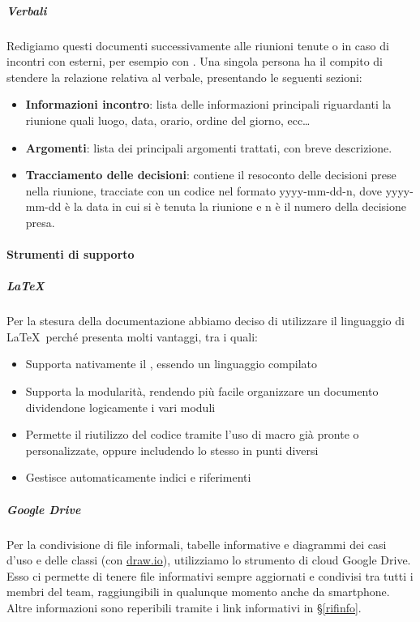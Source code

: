 
            \subparagraph{Verbali}\label{Verbali}
			Redigiamo questi documenti successivamente alle riunioni tenute	o in caso di incontri con  esterni, per esempio con \II. Una singola persona ha il compito di stendere
			la relazione relativa al verbale, presentando le seguenti sezioni:
			\begin{itemize}
				\item \textbf{Informazioni incontro}: lista delle informazioni principali riguardanti la riunione quali luogo, data, orario, ordine del giorno, ecc\dots
				\item \textbf{Argomenti}: lista dei principali argomenti trattati, con breve descrizione.
				\item \textbf{Tracciamento delle decisioni}: contiene il resoconto delle decisioni prese nella riunione, tracciate con un codice nel formato yyyy-mm-dd-n, dove yyyy-mm-dd è la data in cui si è tenuta la riunione e n è il numero della decisione presa.

			\end{itemize}


			\paragraph{Strumenti di supporto}\label{StrumentiDiSupporto}

			\subparagraph{\LaTeX}\label{LaTeX}
			Per la stesura della documentazione abbiamo deciso di utilizzare il linguaggio di  \LaTeX\ perché presenta molti vantaggi, tra i quali:
			\begin{itemize}
				\item Supporta nativamente il , essendo un linguaggio compilato
				\item Supporta la modularità, rendendo più facile organizzare un documento dividendone logicamente i vari moduli
				\item Permette il riutilizzo del codice tramite l'uso di macro già pronte o personalizzate, oppure includendo lo stesso  in punti diversi
				\item Gestisce automaticamente indici e riferimenti
			\end{itemize}

			\subparagraph{Google Drive}\label{GoogleDrive}
			Per la condivisione di file informali, tabelle informative e diagrammi dei casi d'uso e delle classi (con \hyperref[drawio]{draw.io}), utilizziamo lo strumento
			di cloud Google Drive. Esso ci permette di tenere file informativi sempre aggiornati e condivisi tra tutti i membri del team, raggiungibili in qualunque momento
			anche da smartphone. Altre informazioni sono reperibili tramite i link informativi in \S\ref{rifinfo}.

